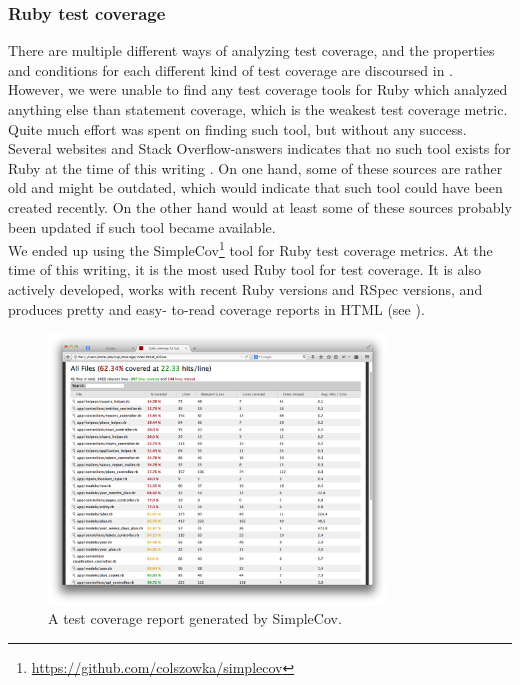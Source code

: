 \subsubsection{Ruby test coverage}
There are multiple different ways of analyzing test coverage, and the
properties and conditions for each different kind of test coverage are
discoursed in . However, we were unable to find any
test coverage tools for Ruby which analyzed anything else than statement
coverage, which is the weakest test coverage metric. Quite much effort
was spent on finding such tool, but without any success. Several
websites and Stack Overflow-answers indicates that no such tool exists
for Ruby at the time of this writing \cite{web:coverage_ruby19,
so:c1c2_coverage, so:c1_coverage, web:toolbox_code_metrics}. On one
hand, some of these sources are rather old and might be outdated, which
would indicate that such tool could have been created recently. On the
other hand would at least some of these sources probably been updated if
such tool became available.\\

We ended up using the
SimpleCov\footnote{\url{https://github.com/colszowka/simplecov}} tool
for Ruby test coverage metrics. At the time of this writing, it is the
most used Ruby tool for test coverage. It is also actively developed,
works with recent Ruby versions and RSpec versions, and produces pretty
and easy- to-read coverage reports in HTML (see
).\cite{web:toolbox_code_metrics}\\

\begin{figure}
\centering
\includegraphics[width=0.8\textwidth]{results/choices/simplecov}
\caption{A test coverage report generated by SimpleCov.}
\label{fig:simplecov_report}
\end{figure}


